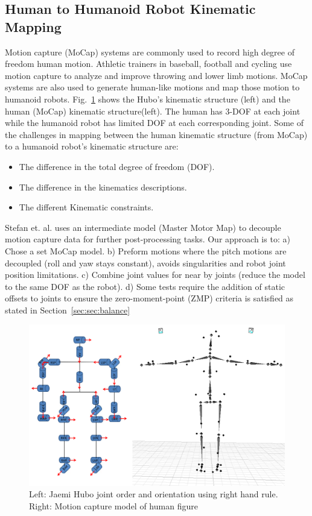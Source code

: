 \subsection{Human to Humanoid Robot Kinematic Mapping}\label{sec:sec:mocap}

Motion capture (MoCap) systems are commonly used to record high degree of freedom human motion.  
Athletic trainers in baseball, football and cycling use motion capture to analyze and improve throwing and lower limb motions\cite{Fleisig1996,barrentiine1998,Mochizuki1998,Akira1999}.
MoCap systems are also used to generate human-like motions and map those motion to humanoid robots\cite{1545060,Polland2002}.  
Fig.~\ref{fig:mocap-joints} shows the Hubo's kinematic structure (left) and the human (MoCap) kinematic structure(left).
The human has 3-DOF at each joint while the humanoid robot has limited DOF at each corresponding joint.
Some of the challenges in mapping between the human kinematic structure (from MoCap) to a humanoid robot's kinematic structure are:

\begin{itemize}
	\item The difference in the total degree of freedom (DOF). 
	\item	The difference in the kinematics descriptions. 
	\item	The different Kinematic constraints.
\end{itemize}

Stefan et. al.\cite{5756898} uses an intermediate model (Master Motor Map) to decouple motion capture data for further post-processing tasks. 
Our approach is to: 
a) Chose a set MoCap model.  
b) Preform motions where the pitch motions are decoupled (roll and yaw stays constant), avoids singularities and robot joint position limitations.  
c) Combine joint values for near by joints (reduce the model to the same DOF as the robot).  
d) Some tests require the addition of static offsets to joints to ensure the zero-moment-point (ZMP) criteria is satisfied as stated in Section~\ref{sec:sec:balance}

\begin{figure}[t]
  \centering
\includegraphics[width=1.0\columnwidth]{./pix/mocapJoints.png}  \caption{Left: Jaemi Hubo joint order and orientation using right hand rule.  Right: Motion capture model of human figure}
  \label{fig:mocap-joints}
\end{figure}



